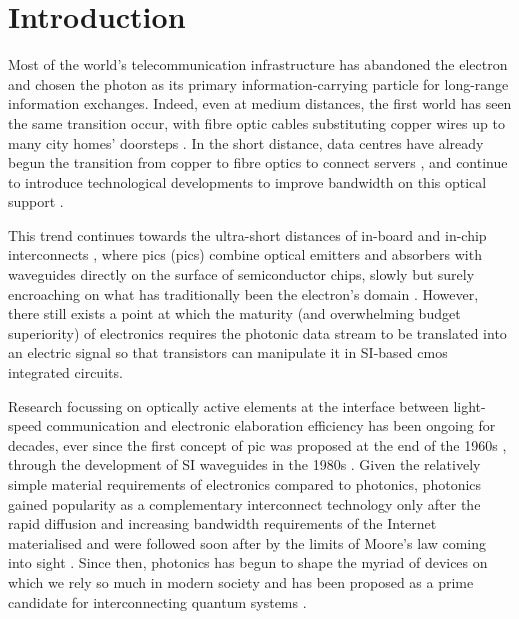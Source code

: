 \chapter{Introduction}
\label{chap:introduction}

Most of the world's telecommunication infrastructure has abandoned the electron and chosen the photon as its primary information-carrying particle for long-range information exchanges. Indeed, even at medium distances, the first world has seen the same transition occur, with fibre optic cables substituting copper wires up to many city homes' doorsteps \cite{ECBroadband, ETNOBroadband}. In the short distance, data centres have already begun the transition from copper to fibre optics to connect servers \cite{Chakravarty2017, Urata2016}, and continue to introduce technological developments to improve bandwidth on this optical support \cite{Cheng2018}. 

This trend continues towards the ultra-short distances of in-board and in-chip interconnects \cite{Benner2005}, where \acl{pic}s (\acs{pic}s) combine optical emitters and absorbers with waveguides directly on the surface of semiconductor chips, slowly but surely encroaching on what has traditionally been the electron's domain \cite{Shekhar2024, Margalit2021, Smit2019}. However, there still exists a point at which the maturity (and overwhelming budget superiority) of electronics requires the photonic data stream to be translated into an electric signal so that transistors can manipulate it in \acl{SI}-based \acf{cmos} integrated circuits. 

Research focussing on optically active elements at the interface between light-speed communication and electronic elaboration efficiency has been ongoing for decades, ever since the first concept of \acs{pic} was proposed at the end of the 1960s \cite{Miller1969}, through the development of \acl{SI} waveguides in the 1980s \cite{Soref1987, Pathak2019}. Given the relatively simple material requirements of electronics compared to photonics, photonics gained popularity as a complementary interconnect technology only after the rapid diffusion and increasing bandwidth requirements of the Internet materialised and were followed soon after by the limits of Moore's law coming into sight \cite{Margalit2021, Bohr1995, Markov2014}. Since then, photonics has begun to shape the myriad of devices on which we rely so much in modern society and has been proposed as a prime candidate for interconnecting quantum systems \cite{Luo2023}.

